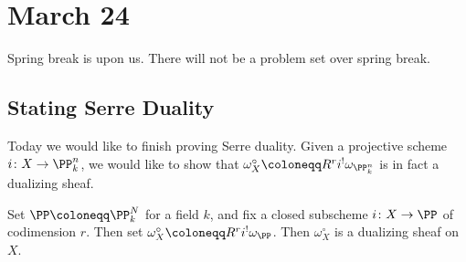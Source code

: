 \documentclass[../notes.tex]{subfiles}
\begin{document}
\section{March 24}

Spring break is upon us. There will not be a problem set over spring break.

\subsection{Stating Serre Duality}
Today we would like to finish proving Serre duality. Given a projective scheme $i\colon X\to\PP^n_k$, we would like to show that $\omega_X^\circ\coloneqq R^ri^!\omega_{\PP^n_k}$ is in fact a dualizing sheaf.
\begin{proposition} \label{prop:dualize-sheaf-proj-scheme}
	Set $\PP\coloneqq\PP^N_k$ for a field $k$, and fix a closed subscheme $i\colon X\to\PP$ of codimension $r$. Then set $\omega_X^\circ\coloneqq R^ri^!\omega_\PP$. Then $\omega^\circ_X$ is a dualizing sheaf on $X$.
\end{proposition}
\end{document}
